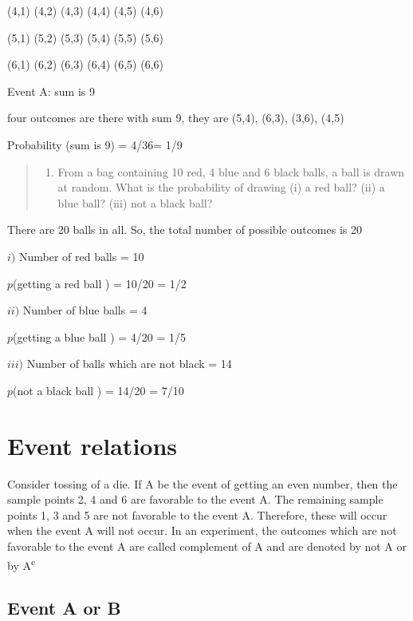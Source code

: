 \documentclass[
]{book}
\providecommand{\tightlist}{%
  \setlength{\itemsep}{0pt}\setlength{\parskip}{0pt}}
\begin{document}
(4,1) (4,2) (4,3) (4,4) (4,5) (4,6)

(5,1) (5,2) (5,3) (5,4) (5,5) (5,6)

(6,1) (6,2) (6,3) (6,4) (6,5) (6,6)

Event A: sum is 9

four outcomes are there with sum 9, they are (5,4), (6,3), (3,6), (4,5)

Probability (sum is 9) = 4/36= 1/9

\begin{quote}
\begin{enumerate}
\def\labelenumi{\arabic{enumi}.}
\setcounter{enumi}{2}
\tightlist
\item
  From a bag containing 10 red, 4 blue and 6 black balls, a ball is drawn at random. What is the probability of drawing (i) a red ball? (ii) a blue ball? (iii) not a black ball?
\end{enumerate}
\end{quote}

There are 20 balls in all. So, the total number of possible outcomes is 20

\(i)\) Number of red balls = 10

\(p\)(getting a red ball ) = 10/20 = 1/2

\(ii)\) Number of blue balls = 4

\(p\)(getting a blue ball ) = 4/20 = 1/5

\(iii)\) Number of balls which are not black = 14

\(p\)(not a black ball ) = 14/20 = 7/10

\hypertarget{event-relations}{%
\section{Event relations}\label{event-relations}}

Consider tossing of a die. If A be the event of getting an even number, then the sample points 2, 4 and 6 are favorable to the event A. The remaining sample points 1, 3 and 5 are not favorable to the event A. Therefore, these will occur when the event A will not occur. In an experiment, the outcomes which are not favorable to the event A are
called complement of A and are denoted by \textquotesingle not\textquotesingle{} A or by A\textsuperscript{c}

\hypertarget{event-a-or-b}{%
\subsection{Event A or B}\label{event-a-or-b}}
\end{document}
